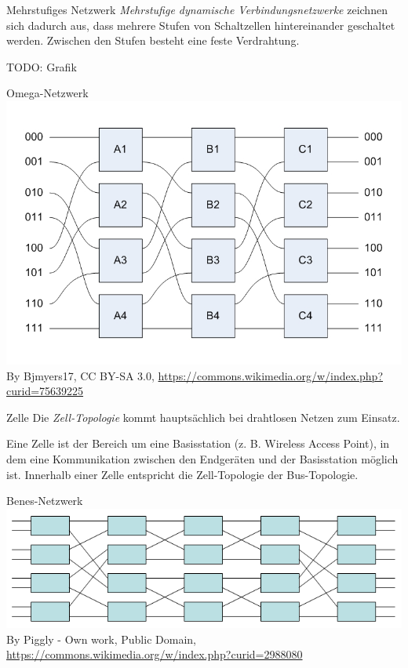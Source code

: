 \begin{defi}{Mehrstufiges Netzwerk}
    \emph{Mehrstufige dynamische Verbindungsnetzwerke} zeichnen sich dadurch aus, dass mehrere Stufen von Schaltzellen hintereinander geschaltet werden.
    Zwischen den Stufen besteht eine feste Verdrahtung.
    
    TODO: Grafik
\end{defi}

\begin{defi}{Omega-Netzwerk}
    \includegraphics[width=\textwidth]{images/OmegaNetwork.jpg}
    By Bjmyers17, CC BY-SA 3.0, \url{https://commons.wikimedia.org/w/index.php?curid=75639225}
\end{defi}

\begin{defi}{Zelle}
    Die \emph{Zell-Topologie} kommt hauptsächlich bei drahtlosen Netzen zum Einsatz.
    
    Eine Zelle ist der Bereich um eine Basisstation (z. B. Wireless Access Point), 
    in dem eine Kommunikation zwischen den Endgeräten und der Basisstation möglich ist.
    Innerhalb einer Zelle entspricht die Zell-Topologie der Bus-Topologie.
\end{defi}

\begin{defi}{Benes-Netzwerk}
    \includegraphics[width=\textwidth]{images/Benesnetwork.png}
    By Piggly - Own work, Public Domain, \url{https://commons.wikimedia.org/w/index.php?curid=2988080}
\end{defi}

